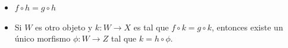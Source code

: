 \documentclass[10pt]{article}
\newtheorem[M]{teo}{Teorema}[section]
\newtheorem[M]{listaObj}[teo]{Lista de deseos}
\newtheorem[M]{preg}[teo]{Pregunta}
\newtheorem[M]{lema}[teo]{Lema}
\newtheorem[M]{hip}[teo]{Hipótesis}
\newtheorem[M]{prop}[teo]{Proposición}
\newtheorem[M]{obs}[teo]{Observación}
\newtheorem[M]{cor}[teo]{Corolario}
\newtheorem[M]{notacion}[teo]{Notación}
\newtheorem[M]{nota}[teo]{Nota}
\begin{document}
\begin{minipage}{0.5\textwidth}
\begin{itemize}
	\item $f \circ h = g \circ h$
	\item Si $W$ es otro objeto y $k : W \longrightarrow X$
	es tal que $f \circ k = g \circ k$, entonces
	existe un único morfismo $\phi: W \longrightarrow Z$
	tal que $k = h \circ \phi$. 
\end{itemize}
\end{minipage} \hfill
\begin{minipage}{0.45\textwidth}

\begin{center}
\begin{tikzpicture}[x=0.75pt,y=0.75pt,yscale=-1,xscale=1]



\end{tikzpicture}
\end{center}
\end{minipage}
\end{document}
